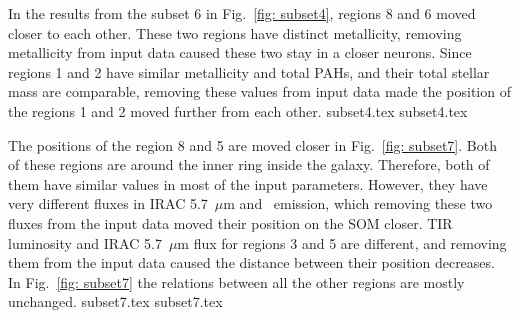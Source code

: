         In the results from the subset 6 in Fig.~\ref{fig: subset4}, regions 8 and 6 moved closer to each other. 
        These two regions have distinct metallicity, removing metallicity from input data caused these two stay in a closer neurons. 
        Since regions 1 and 2 have similar metallicity and total PAHs, and their total stellar mass are comparable, removing these values from input data made the position of the regions 1 and 2 moved further from each other. 
        {subset4.tex}
        {subset4.tex}
        
        The positions of the region 8 and 5 are moved closer in Fig.~\ref{fig: subset7}.
        Both of these regions are around the inner ring inside the galaxy.
        Therefore, both of them have similar values in most of the input parameters.
        However, they have very different fluxes in IRAC 5.7~$\mu$m and \sii~emission, which removing these two fluxes from the input data moved their position on the SOM closer.
        TIR luminosity and IRAC 5.7~$\mu$m flux for regions 3 and 5 are different, and removing them from the input data caused the distance between their position decreases. 
        In Fig.~\ref{fig: subset7} the relations between all the other regions are mostly unchanged.
        {subset7.tex}
        {subset7.tex}
        
